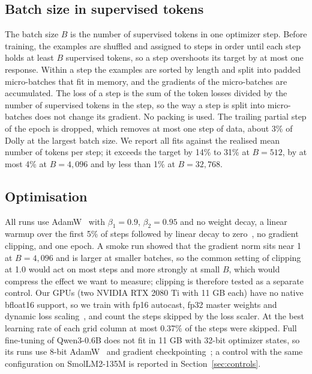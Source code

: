 \documentclass[10pt]{article}
\begin{document}
\subsection{Batch size in supervised tokens}

The batch size $B$ is the number of supervised tokens in one optimizer step. Before training, the examples are shuffled and assigned to steps in order until each step holds at least $B$ supervised tokens, so a step overshoots its target by at most one response. Within a step the examples are sorted by length and split into padded micro-batches that fit in memory, and the gradients of the micro-batches are accumulated. The loss of a step is the sum of the token losses divided by the number of supervised tokens in the step, so the way a step is split into micro-batches does not change its gradient. No packing is used. The trailing partial step of the epoch is dropped, which removes at most one step of data, about 3\% of Dolly at the largest batch size. We report all fits against the realised mean number of tokens per step; it exceeds the target by 14\% to 31\% at $B = 512$, by at most 4\% at $B = 4{,}096$ and by less than 1\% at $B = 32{,}768$.

\subsection{Optimisation}

All runs use AdamW~\citep{kingma2015adam,loshchilov2019adamw} with $\beta_1 = 0.9$, $\beta_2 = 0.95$ and no weight decay, a linear warmup over the first 5\% of steps followed by linear decay to zero~\citep{bergsma2025}, no gradient clipping, and one epoch. A smoke run showed that the gradient norm sits near 1 at $B = 4{,}096$ and is larger at smaller batches, so the common setting of clipping at 1.0 would act on most steps and more strongly at small $B$, which would compress the effect we want to measure; clipping is therefore tested as a separate control. Our GPUs (two NVIDIA RTX 2080 Ti with 11 GB each) have no native bfloat16 support, so we train with fp16 autocast, fp32 master weights and dynamic loss scaling~\citep{micikevicius2018}, and count the steps skipped by the loss scaler. At the best learning rate of each grid column at most 0.37\% of the steps were skipped. Full fine-tuning of Qwen3-0.6B does not fit in 11 GB with 32-bit optimizer states, so its runs use 8-bit AdamW~\citep{dettmers2022} and gradient checkpointing~\citep{chen2016checkpointing}; a control with the same configuration on SmolLM2-135M is reported in Section~\ref{sec:controls}.
\end{document}
